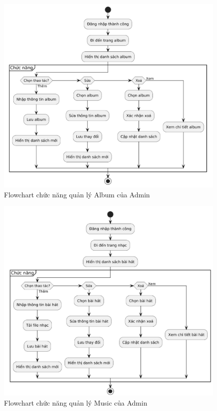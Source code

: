 \begin{figure}
    \centering
    \includegraphics[width=1\linewidth]{images/flowchart-admin-album.png}
    \caption{Flowchart chức năng quản lý Album của Admin}
    \label{fig:flowchart-admin-album}
\end{figure}

\begin{figure}
    \centering
    \includegraphics[width=1\linewidth]{images/flowchart-admin-music.png}
    \caption{Flowchart chức năng quản lý Music của Admin}
    \label{fig:flowchart-admin-music}
\end{figure}

